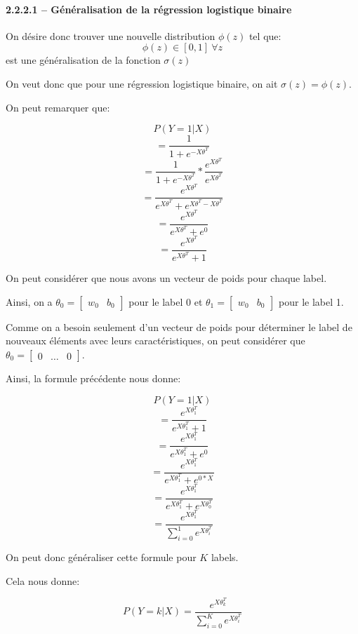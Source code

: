 \documentclass[
]{article}
\begin{document}
\hypertarget{guxe9nuxe9ralisation-de-la-ruxe9gression-logistique-binaire}{%
\paragraph{2.2.2.1 -- Généralisation de la régression logistique
binaire}\label{guxe9nuxe9ralisation-de-la-ruxe9gression-logistique-binaire}}

On désire donc trouver une nouvelle distribution \(\phi(z)\) tel que:
\[\phi(z) \in [0, 1]\ \forall z\] est une généralisation de la fonction
\(\sigma(z)\)

On veut donc que pour une régression logistique binaire, on ait
\(\sigma(z) = \phi(z)\).

On peut remarquer que:

\[P(Y = 1 | X)\] \[=\frac{1}{1 + e^{-X \theta^T}}\]
\[=\frac{1}{1 + e^{-X \theta^T}} * \frac{e^{X \theta^T}}{e^{X \theta^T}}\]
\[=\frac{e^{X \theta^T}}{e^{X \theta^T} + e^{X \theta^T - X \theta^T}}\]
\[=\frac{e^{X \theta^T}}{e^{X \theta^T} + e^0}\]
\[=\frac{e^{X \theta^T}}{e^{X \theta^T} + 1}\]

On peut considérer que nous avons un vecteur de poids pour chaque label.

Ainsi, on a \(\theta_0 = \begin{bmatrix} w_0 & b_0 \end{bmatrix}\) pour
le label 0 et \(\theta_1 = \begin{bmatrix} w_0 & b_0 \end{bmatrix}\)
pour le label 1.

Comme on a besoin seulement d'un vecteur de poids pour déterminer le
label de nouveaux éléments avec leurs caractéristiques, on peut
considérer que
\(\theta_0 = \begin{bmatrix} 0 & \dots & 0 \end{bmatrix}\).

Ainsi, la formule précédente nous donne:

\[P(Y = 1 | X)\] \[=\frac{e^{X \theta_1^T}}{e^{X \theta_1^T} + 1}\]
\[=\frac{e^{X \theta_1^T}}{e^{X \theta_1^T} + e^0}\]
\[=\frac{e^{X \theta_1^T}}{e^{X \theta_1^T} + e^{0 * X}}\]
\[=\frac{e^{X \theta_1^T}}{e^{X \theta_1^T} + e^{X \theta_0^T}}\]
\[=\frac{e^{X \theta_1^T}}{\sum_{i = 0}^1 e^{X \theta_i^T}}\]

On peut donc généraliser cette formule pour \(K\) labels.

Cela nous donne:

\[P(Y = k| X )=\frac{e^{X \theta_k^T}}{\sum_{i = 0}^K e^{X \theta_i^T}}\]
\end{document}
